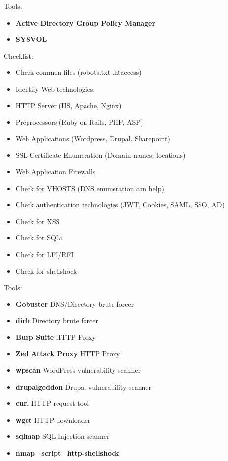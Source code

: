 \documentclass[a4paper,10pt]{article}
\begin{document}
\begin{multicols}{2}
\begin{tcolorbox}[breakable,title=Group Policy]
Tools:
\begin{itemize}
	\itemsep0em
	\item \textbf{Active Directory Group Policy Manager}
	\item \textbf{SYSVOL}
\end{itemize}
\end{tcolorbox}
\begin{tcolorbox}[title=HTTP/HTTPS]
Checklist:
\begin{itemize}
	\itemsep0em 
	\item Check common files (robots.txt .htaccess)
	\item Identify Web technologies:
	\item HTTP Server (IIS, Apache, Nginx)
	\item Preprocessors (Ruby on Rails, PHP, ASP)
	\item Web Applications (Wordpress, Drupal, Sharepoint)
	\item SSL Certificate Enumeration (Domain names, locations)
	\item Web Application Firewalls
	\item Check for VHOSTS (DNS enumeration can help)
	\item Check authentication technologies (JWT, Cookies, SAML, SSO, AD)
	\item Check for XSS
	\item Check for SQLi
	\item Check for LFI/RFI
	\item Check for shellshock
\end{itemize}
Tools:
\begin{itemize}
	\itemsep0em	
	\item \textbf{Gobuster} DNS/Directory brute forcer
	\item \textbf{dirb} Directory brute forcer
	\item \textbf{Burp Suite} HTTP Proxy
	\item \textbf{Zed Attack Proxy} HTTP Proxy
	\item \textbf{wpscan} WordPress vulnerability scanner
	\item \textbf{drupalgeddon} Drupal vulnerability scanner
	\item \textbf{curl} HTTP request tool
	\item \textbf{wget} HTTP downloader
	\item \textbf{sqlmap} SQL Injection scanner
	\item \textbf{nmap --script=http-shellshock}
\end{itemize}
\end{tcolorbox}


\end{multicols}
\end{document}
